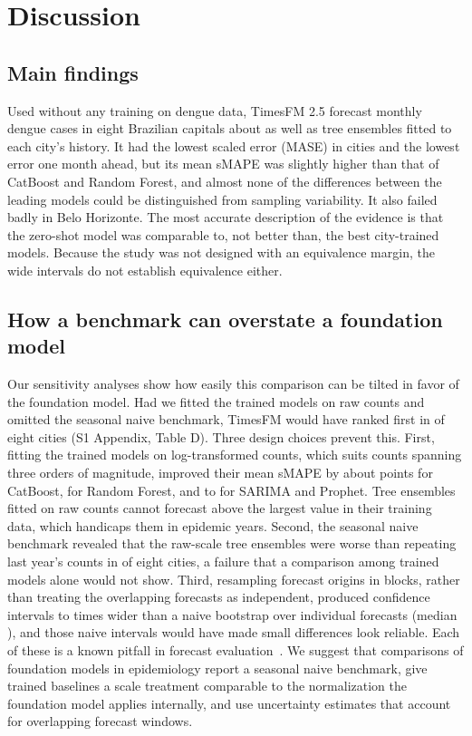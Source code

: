 \documentclass[10pt,letterpaper]{article}
\begin{document}
\section*{Discussion}
\subsection*{Main findings}
Used without any training on dengue data, TimesFM 2.5 forecast monthly dengue cases in eight Brazilian capitals about as well as tree ensembles fitted to each city's history. It had the lowest scaled error (MASE) in  cities and the lowest error one month ahead, but its mean sMAPE was slightly higher than that of CatBoost and Random Forest, and almost none of the differences between the leading models could be distinguished from sampling variability. It also failed badly in Belo Horizonte. The most accurate description of the evidence is that the zero-shot model was comparable to, not better than, the best city-trained models. Because the study was not designed with an equivalence margin, the wide intervals do not establish equivalence either.

\subsection*{How a benchmark can overstate a foundation model}
Our sensitivity analyses show how easily this comparison can be tilted in favor of the foundation model. Had we fitted the trained models on raw counts and omitted the seasonal naive benchmark, TimesFM would have ranked first in  of eight cities (S1 Appendix, Table D). Three design choices prevent this. First, fitting the trained models on log-transformed counts, which suits counts spanning three orders of magnitude, improved their mean sMAPE by about  points for CatBoost,  for Random Forest, and  to  for SARIMA and Prophet. Tree ensembles fitted on raw counts cannot forecast above the largest value in their training data, which handicaps them in epidemic years. Second, the seasonal naive benchmark revealed that the raw-scale tree ensembles were worse than repeating last year's counts in  of eight cities, a failure that a comparison among trained models alone would not show. Third, resampling forecast origins in blocks, rather than treating the  overlapping forecasts as independent, produced confidence intervals  to  times wider than a naive bootstrap over individual forecasts (median ), and those naive intervals would have made small differences look reliable. Each of these is a known pitfall in forecast evaluation~\cite{Hewamalage2023}. We suggest that comparisons of foundation models in epidemiology report a seasonal naive benchmark, give trained baselines a scale treatment comparable to the normalization the foundation model applies internally, and use uncertainty estimates that account for overlapping forecast windows.
\end{document}
